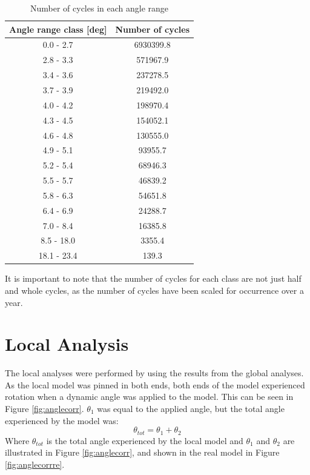 \begin{table} [H]
\centering
\begin{tabular}{ |c|c|}
\hline
Angle range class [deg] & Number of cycles \\
 \hline
 \hline
0.0 - 2.7 & 6930399.8\\

2.8 - 3.3 & 571967.9\\
 
3.4 - 3.6 & 237278.5 \\
 
3.7 - 3.9& 219492.0  \\

4.0 - 4.2& 198970.4  \\

4.3  - 4.5 & 154052.1  \\

4.6 - 4.8 & 130555.0 \\

4.9 - 5.1 & 93955.7 \\

5.2 - 5.4 & 68946.3 \\

5.5 - 5.7 & 46839.2 \\

5.8 - 6.3 & 54651.8 \\

6.4 - 6.9 & 24288.7 \\

7.0 - 8.4 & 16385.8 \\

8.5 - 18.0 & 3355.4 \\

18.1 - 23.4 & 139.3  \\

 \hline
\end{tabular}
\caption{Number of cycles in each angle range}
\label{table:angleclass}
\end{table} 
\noindent It is important to note that the number of cycles for each class are not just half and whole cycles, as the number of cycles have been scaled for occurrence over a year.\newline 
\newline

\section{Local Analysis}
The local analyses were performed by using the results from the global analyses. As the local model was pinned in both ends, both ends of the model experienced rotation when a dynamic angle was applied to the model. This can be seen in Figure \ref{fig:anglecorr}. $\theta_1$ was equal to the applied angle, but the total angle experienced by the model was:
\begin{equation}
    \theta_{tot}=\theta_1 + \theta_2
\end{equation}
Where $\theta_{tot}$ is the total angle experienced by the local model and $\theta_1$ and $\theta_2$ are illustrated in Figure \ref{fig:anglecorr}, and shown in the real model in Figure \ref{fig:anglecorrre}.

